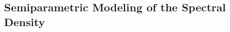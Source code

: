 \documentclass[12pt]{article}
\begin{document}























\subsection{Semiparametric Modeling of the Spectral \\ Density} %
\label{sec:semiparametric_modeling_of_the_spectral_density}
\end{document}
